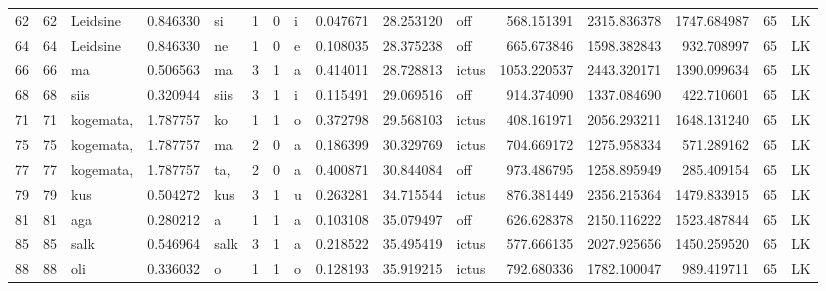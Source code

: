 \begin{tabular}{lrlrllllrrlrrrll}
62   &          62 &         Leidsine &  0.846330 &      si &        1 &      0 &       i &      0.047671 &     28.253120 &    off &   568.151391 &  2315.836378 &  1747.684987 &     65 &        LK \\
64   &          64 &         Leidsine &  0.846330 &      ne &        1 &      0 &       e &      0.108035 &     28.375238 &    off &   665.673846 &  1598.382843 &   932.708997 &     65 &        LK \\
66   &          66 &               ma &  0.506563 &      ma &        3 &      1 &       a &      0.414011 &     28.728813 &  ictus &  1053.220537 &  2443.320171 &  1390.099634 &     65 &        LK \\
68   &          68 &             siis &  0.320944 &    siis &        3 &      1 &       i &      0.115491 &     29.069516 &    off &   914.374090 &  1337.084690 &   422.710601 &     65 &        LK \\
71   &          71 &        kogemata, &  1.787757 &      ko &        1 &      1 &       o &      0.372798 &     29.568103 &  ictus &   408.161971 &  2056.293211 &  1648.131240 &     65 &        LK \\
75   &          75 &        kogemata, &  1.787757 &      ma &        2 &      0 &       a &      0.186399 &     30.329769 &  ictus &   704.669172 &  1275.958334 &   571.289162 &     65 &        LK \\
77   &          77 &        kogemata, &  1.787757 &     ta, &        2 &      0 &       a &      0.400871 &     30.844084 &    off &   973.486795 &  1258.895949 &   285.409154 &     65 &        LK \\
79   &          79 &              kus &  0.504272 &     kus &        3 &      1 &       u &      0.263281 &     34.715544 &  ictus &   876.381449 &  2356.215364 &  1479.833915 &     65 &        LK \\
81   &          81 &              aga &  0.280212 &       a &        1 &      1 &       a &      0.103108 &     35.079497 &    off &   626.628378 &  2150.116222 &  1523.487844 &     65 &        LK \\
85   &          85 &             salk &  0.546964 &    salk &        3 &      1 &       a &      0.218522 &     35.495419 &  ictus &   577.666135 &  2027.925656 &  1450.259520 &     65 &        LK \\
88   &          88 &              oli &  0.336032 &       o &        1 &      1 &       o &      0.128193 &     35.919215 &  ictus &   792.680336 &  1782.100047 &   989.419711 &     65 &        LK \\

\end{tabular}
